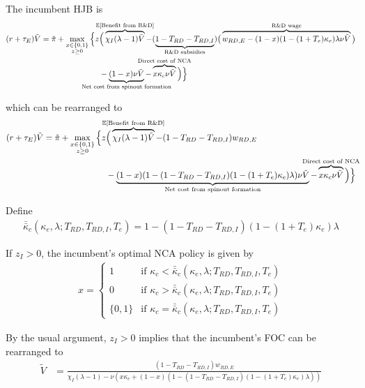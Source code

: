 \documentclass[11pt,english]{article}
\theoremstyle{remark}
\begin{document}
The incumbent HJB is
\begin{align}
(r + \tau_E) \tilde{V} = \tilde{\pi} + \max_{\substack{x \in \{0,1\} \\ z \ge 0}} \Big\{z &\Big( \overbrace{\chi_I (\lambda - 1) \tilde{V}}^{\mathclap{\mathbb{E}[\textrm{Benefit from R\&D}]}}-  (\underbrace{1 - T_{RD} - T_{RD,I}}_{\mathclap{\text{R\&D subsidies}}})\big( \overbrace{w_{RD,E} - (1-x)(1-(1+T_e)\kappa_e)\lambda \nu \tilde{V}}^{\mathclap{\text{R\&D wage}}}\big) \label{eq:hjb_incumbent_all} \nonumber \\ 
&-  \underbrace{(1-x) \nu \tilde{V}}_{\mathclap{\text{Net cost from spinout formation}}} - \overbrace{x \kappa_{c} \nu \tilde{V}}^{\mathclap{\text{Direct cost of NCA}}}\Big) \Big\} 
\end{align}

which can be rearranged to
\begin{align}
(r + \tau_E) \tilde{V} = \tilde{\pi} + \max_{\substack{x \in \{0,1\} \\ z \ge 0}} \Big\{z &\Big( \overbrace{\chi_I (\lambda - 1) \tilde{V}}^{\mathclap{\mathbb{E}[\textrm{Benefit from R\&D}]}}- (1-T_{RD}- T_{RD,I})w_{RD,E} \\
&-  \underbrace{(1-x)(1 - (1-T_{RD} - T_{RD,I})(1-(1+T_e)\kappa_{e})\lambda)\nu \tilde{V}}_{\mathclap{\text{Net cost from spinout formation}}} - \overbrace{x \kappa_{c} \nu \tilde{V}}^{\mathclap{\text{Direct cost of NCA}}}\Big) \Big\} \label{eq:hjb_incumbent_all_2}
\end{align}

Define
\begin{align}
\bar{\bar{\kappa}}_c(\kappa_e,\lambda;T_{RD},T_{RD,I},T_e) = 1 - (1-T_{RD} - T_{RD,I})(1-(1+T_e)\kappa_e)\lambda  \label{eq:barkappa_all}
\end{align} 

If $z_I > 0$, the incumbent's optimal NCA policy is given by 
\begin{align}
x = \begin{cases}
1 & \textrm{if } \kappa_{c} < \bar{\bar{\kappa}}_c (\kappa_e, \lambda;T_{RD},T_{RD,I},T_e) \\
0 & \textrm{if } \kappa_{c} > \bar{\bar{\kappa}}_c (\kappa_e, \lambda;T_{RD},T_{RD,I},T_e)\\
\{0,1\} & \textrm{if } \kappa_c = \bar{\bar{\kappa}}_c (\kappa_e, \lambda;T_{RD},T_{RD,I},T_e)
\end{cases} \label{eq:nca_policy_all}
\end{align}


By the usual argument, $z_I > 0$ implies that the incumbent's FOC can be rearranged to
\begin{align}
\tilde{V} &= \frac{(1-T_{RD} - T_{RD,I})w_{RD,E}}{\chi_I(\lambda -1) - \nu (x\kappa_c + (1-x)(1 - (1-T_{RD} - T_{RD,I})(1-(1+T_e)\kappa_e)\lambda)) } \label{eq:hjb_incumbent_foc_all}
\end{align}
\end{document}
